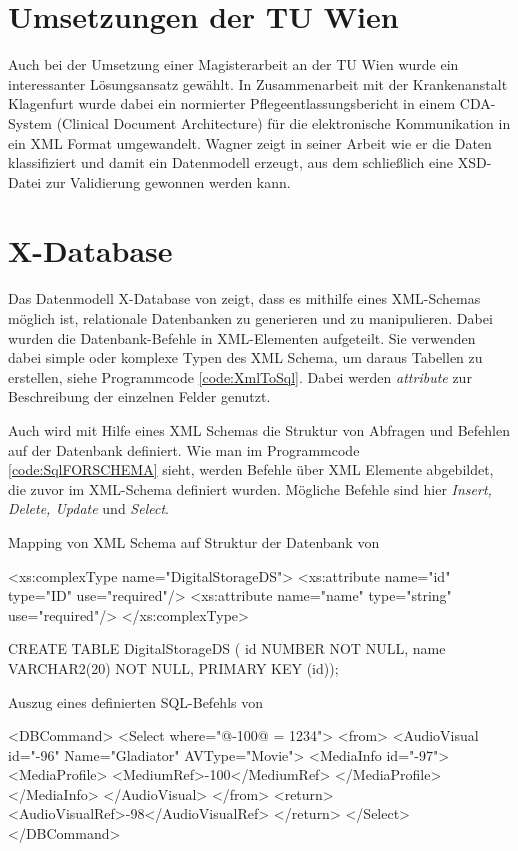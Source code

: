 \section{Umsetzungen der TU Wien}
Auch bei der Umsetzung einer Magisterarbeit an der TU Wien wurde ein interessanter Lösungsansatz gewählt.
In Zusammenarbeit mit der Krankenanstalt Klagenfurt wurde dabei ein normierter Pflegeentlassungsbericht in einem CDA-System (Clinical Document Architecture) für die elektronische Kommunikation in ein XML Format umgewandelt.
Wagner zeigt in seiner Arbeit \cite{Wagner2007} wie er die Daten klassifiziert und damit ein Datenmodell erzeugt, aus dem schließlich eine XSD-Datei zur Validierung gewonnen werden kann.

\section{X-Database}
Das Datenmodell X-Database von \cite{Varlamis2001BridgingXA} zeigt, dass es mithilfe eines XML-Schemas möglich ist, relationale Datenbanken zu generieren und zu manipulieren. Dabei wurden die Datenbank-Befehle in XML-Elementen aufgeteilt. Sie verwenden dabei simple oder komplexe Typen des XML Schema, um daraus Tabellen zu erstellen, siehe Programmcode \ref{code:XmlToSql}. Dabei werden \emph{attribute} zur Beschreibung der einzelnen Felder genutzt. 

Auch wird mit Hilfe eines XML Schemas die Struktur von Abfragen und Befehlen auf der Datenbank definiert. Wie man im Programmcode \ref{code:SqlFORSCHEMA} sieht, werden Befehle über XML Elemente abgebildet, die zuvor im XML-Schema definiert wurden. Mögliche Befehle sind hier \emph{Insert, Delete, Update} und \emph{Select}.

\begin{program}
\caption{Mapping von XML Schema auf Struktur der Datenbank von\cite{Varlamis2001BridgingXA}}
\label{code:XmlToSql}
\begin{XmlCode}
<xs:complexType name="DigitalStorageDS">
<xs:attribute name="id" type="ID"
use="required"/>
<xs:attribute name="name" type="string"
use="required"/>
</xs:complexType>
\end{XmlCode}
\label{code:ResultingSQL}
\begin{GenericCode}
CREATE TABLE DigitalStorageDS (
id NUMBER NOT NULL,
name VARCHAR2(20) NOT NULL,
PRIMARY KEY (id));
\end{GenericCode}
\end{program}


\begin{program}
\caption{Auszug eines definierten SQL-Befehls von \cite{Varlamis2001BridgingXA}}
\label{code:SqlFORSCHEMA}
\begin{GenericCode}
    <DBCommand>
    <Select where="@-100@ = 1234">
    <from>
        <AudioVisual id="-96" Name="Gladiator"
         AVType="Movie">
            <MediaInfo id="-97">
            <MediaProfile>
            <MediumRef>-100</MediumRef>
            </MediaProfile>
            </MediaInfo>
        </AudioVisual>
    </from>
    <return>
    <AudioVisualRef>-98</AudioVisualRef>
    </return>
    </Select>
    </DBCommand>
\end{GenericCode}
\end{program}


